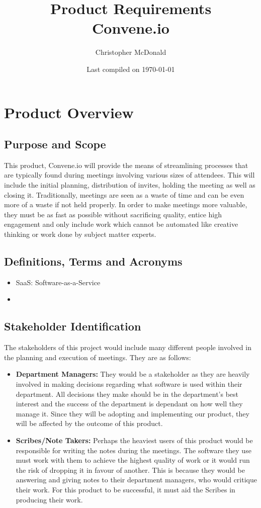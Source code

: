 \documentclass[11pt, oneside]{article}
\title{ Product Requirements \\ Convene.io}
\author{Christopher McDonald}
\date{Last compiled on \today}
\begin{document}
\maketitle
\tableofcontents
\section{Product Overview}
\subsection{Purpose and Scope}
This product, Convene.io will provide the means of streamlining processes that are typically found during meetings involving various sizes of attendees. This will include the initial planning, distribution of invites, holding the meeting as well as closing it. Traditionally, meetings are seen as a waste of time and can be even more of a waste if not held properly. In order to make meetings more valuable, they must be as fast as possible without sacrificing quality, entice high engagement and only include work which cannot be automated like creative thinking or work done by subject matter experts. \\
\subsection{Definitions, Terms and Acronyms}
\begin{itemize}
\item SaaS: Software-as-a-Service
\item
\end{itemize}
\subsection{Stakeholder Identification}
The stakeholders of this project would include many different people involved in the planning and execution of meetings. They are as follows: \\
\begin{itemize}
	\item \textbf{Department Managers:} They would be a stakeholder as they are heavily involved in making decisions regarding what software is used within their department. All decisions they make should be in the department's best interest and the success of the department is dependant on how well they manage it. Since they will be adopting and implementing our product, they will be affected by the outcome of this product.  
	\item \textbf{Scribes/Note Takers:} Perhaps the heaviest users of this product would be responsible for writing the notes during the meetings. The software they use must work with them to achieve the highest quality of work or it would run the risk of dropping it in favour of another. This is because they would be answering and giving notes to their department managers, who would critique their work. For this product to be successful, it must aid the Scribes in producing their work. 
\end{itemize}
\end{document}
